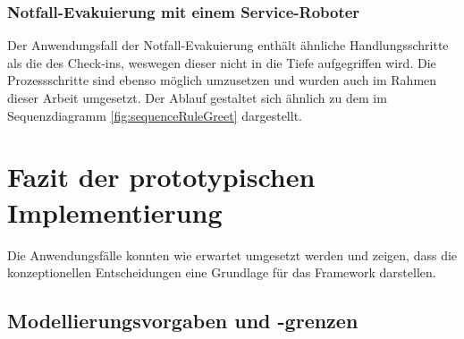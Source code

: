 \subsubsection*{Notfall-Evakuierung mit einem Service-Roboter}
    Der Anwendungsfall der Notfall-Evakuierung enthält ähnliche Handlungsschritte als die des Check-ins, weswegen dieser nicht in die 
    Tiefe aufgegriffen wird. Die Prozessschritte sind ebenso möglich umzusetzen und wurden auch im Rahmen dieser 
    Arbeit umgesetzt. Der Ablauf gestaltet sich ähnlich zu dem im Sequenzdiagramm \ref{fig:sequenceRuleGreet} dargestellt. 
    
\section{Fazit der prototypischen Implementierung}
    Die Anwendungsfälle konnten wie erwartet umgesetzt werden und zeigen, dass die konzeptionellen Entscheidungen eine Grundlage für das 
    Framework darstellen. 

\subsection{Modellierungsvorgaben und -grenzen}
\label{subsec:modellierungsgrenzen}



